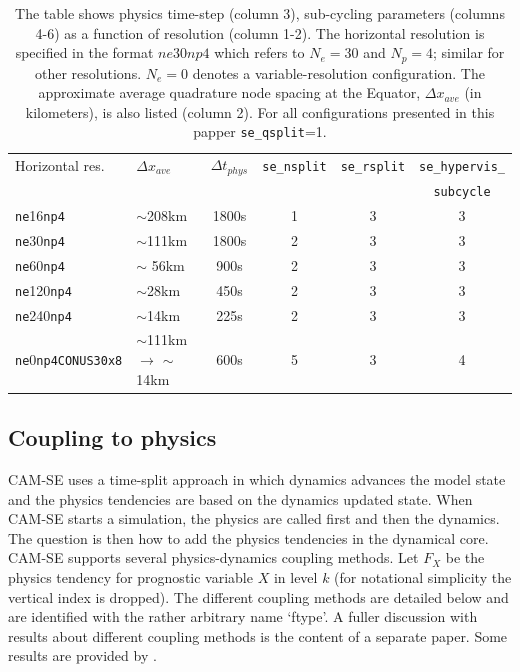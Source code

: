 \documentclass{agujournal}
\begin{document}
 \begin{table}
 \caption{The table shows physics time-step (column 3), sub-cycling parameters (columns 4-6) as a function of resolution (column 1-2). The horizontal resolution is specified in the format $ne30np4$ which refers to $N_e=30$ and $N_p=4$; similar for other resolutions.  $N_e=0$ denotes a variable-resolution configuration. The approximate average quadrature node spacing at the Equator, $\Delta x_{ave}$ (in kilometers), is also listed (column 2). For all configurations presented in this papper {\tt{se\_qsplit}}=1.}
 \centering
 \begin{tabular}{llcccc}
 \hline
 Horizontal res. & $\Delta x_{ave}$  & $\Delta t_{phys}$ & {\tt{se\_nsplit}} & {\tt{se\_rsplit}} & {\tt{se\_hypervis\_}} \\
 &&&&&{\tt subcycle} \\
 \hline
   {\tt{ne}}16{\tt{np4}}  & $\sim$208km   & 1800s & 1 & 3 & 3  \\
   {\tt{ne}}30{\tt{np4}}  & $\sim$111km   & 1800s & 2 & 3 & 3  \\
   {\tt{ne}}60{\tt{np4}}  & $\sim$ 56km   & 900s  & 2 & 3 & 3  \\
   {\tt{ne}}120{\tt{np4}} & $\sim$28km    & 450s  & 2 & 3 & 3  \\
   {\tt{ne}}240{\tt{np4}} &  $\sim$14km   & 225s  & 2 & 3 & 3  \\
   {\tt{ne}}0{\tt{np4CONUS30x8}}  & $\sim$111km$\rightarrow$ $\sim$14km &  600s & 5 & 3 & 4  \\
 \hline
 \end{tabular}
 \label{table:subc}
 \end{table}

%
\subsection{Coupling to physics}
CAM-SE uses a time-split approach in which dynamics advances the model state and the physics tendencies are based on the dynamics updated state. When CAM-SE starts a simulation, the physics are called first and then the  dynamics. The question is then how to add the physics tendencies in the dynamical core. CAM-SE supports several physics-dynamics coupling methods. Let $F_X$ be the physics tendency for prognostic variable $X$ in level $k$ (for notational simplicity the vertical index is dropped). The different coupling methods are detailed below and are identified with the rather arbitrary name `ftype'. A fuller discussion with results about different coupling methods is the content of a separate paper. Some results are provided by \citet{TJ2016GMD}.
\end{document}
